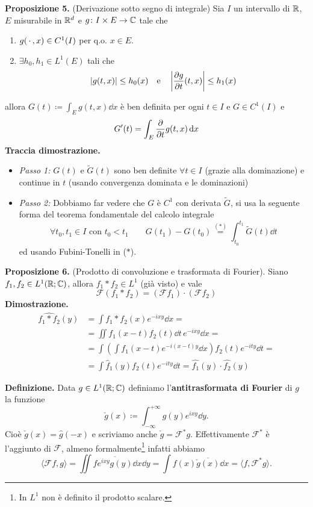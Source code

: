 \textbf{Proposizione 5.} (Derivazione sotto segno di integrale)
Sia $I$ un intervallo di $\mathbb R$, $E$ misurabile in $\mathbb R^d$ e $g \colon I \times E \to \mathbb C$ tale che
\begin{enumerate}
	\item $g(\,\cdot\,, x) \in C^1(I)$ per q.o. $x \in E$.
	\item $\exists h_0, h_1 \in L^1(E)$ tali che
		$$
		|g(t, x)| \leq h_0(x) 
		\quad
		\text{e}
		\quad
		\left|\frac{\partial g}{\partial t}(t, x)\right| \leq h_1(x)
		$$
\end{enumerate}
allora $G(t) \coloneqq \int_E g(t, x) \dd x$ è ben definita per ogni $t \in I$ e $G \in C^1(I)$ e
$$
G'(t) = \int_E \frac{\partial}{\partial t}g(t, x) \,\mathrm{d} x
$$
\textbf{Traccia dimostrazione.}
\begin{itemize}
	\item \textit{Passo 1:} $G(t)$ e $\tilde G(t)$ sono ben definite $\forall t \in I$ (grazie alla dominazione) e continue in $t$ (usando convergenza dominata e le dominazioni)
	\item \textit{Passo 2:} Dobbiamo far vedere che $G$ è $C^1$ con derivata $\tilde G$, si usa la seguente forma del teorema fondamentale del calcolo integrale
		$$
		\forall t_0, t_1 \in I \text{ con } t_0 < t_1
		\qquad
		G(t_1) - G(t_0) \overset{(*)}{=} \int_{t_0}^{t_1} \tilde G(t) \dd t
		$$
		ed usando Fubini-Tonelli in ($*$).
\end{itemize}

\textbf{Proposizione 6.} (Prodotto di convoluzione e trasformata di Fourier).
Siano $f_1, f_2 \in L^1(\mathbb R; \mathbb C)$, allora $f_1 \ast f_2 \in L^1$ (già visto) e vale
$$
\mathcal F(f_1 \ast f_2) = (\mathcal F f_1) \cdot (\mathcal F f_2)
$$
\textbf{Dimostrazione.}
$$
\begin{aligned}
	\hat{f_1 \ast f_2}(y)
	&= \int f_1 \ast f_2 (x) e^{-ixy} \dd x = \\
	&= \iint f_1(x - t) f_2(t) \dd t \, e^{-ixy} \dd x = \\
	&= \int \left(\int f_1(x - t) e^{-i(x - t)y} \dd x \right) f_2(t) e^{-ity} \dd t = \\
	&= \int \hat f_1(y) f_2(t) e^{-ity} \dd t = \hat{f_1}(y) \cdot \hat{f_2}(y)
\end{aligned}
$$

\textbf{Definizione.}
Data $g \in L^1(\mathbb R; \mathbb C)$ definiamo l'\textbf{antitrasformata di Fourier} di $g$ la funzione
$$
	\check g(x) \coloneqq \int_{-\infty}^{+\infty} g(y) e^{ixy} \dd y.
$$
Cioè $\check g(x) = \hat g(-x)$ e scriviamo anche $\check g = \mathcal F^* g$. Effettivamente $\mathcal F^*$ è l'aggiunto di $\mathcal F$, almeno formalmente\footnote{In $L^1$ non è definito il prodotto scalare.} infatti abbiamo
$$
	\langle \mathcal F f, g \rangle
	= \iint f \overline{e^{ixy} g(y)} \dd x \dd y
	= \int f(x) \overline{\check g(x)} \dd x
	= \langle f, \mathcal F^* g \rangle.
$$

